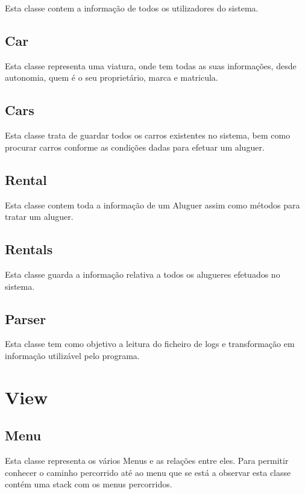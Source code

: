 \documentclass[a4paper]{report}
\begin{document}
Esta classe contem a informação de todos os utilizadores do sistema.

\subsection{Car}\label{chap:car}

Esta classe representa uma viatura, onde tem todas as suas informações,
desde autonomia, quem é o seu proprietário, marca e matricula.

\subsection{Cars}

Esta classe trata de guardar todos os carros existentes no sistema, bem
como procurar carros conforme as condições dadas para efetuar um aluguer.

\subsection{Rental}

Esta classe contem toda a informação de um Aluguer assim como métodos para tratar
um aluguer.

\subsection{Rentals}

Esta classe guarda a informação relativa a todos os alugueres efetuados
no sistema.

\subsection{Parser}

Esta classe tem como objetivo a leitura do ficheiro de logs e transformação
em informação utilizável pelo programa.

\section{View}

\subsection{Menu}

Esta classe representa os vários Menus e as relações entre eles. Para permitir
conhecer o caminho percorrido até ao menu que se está a observar esta classe
contém uma stack com os menus percorridos.
\end{document}

